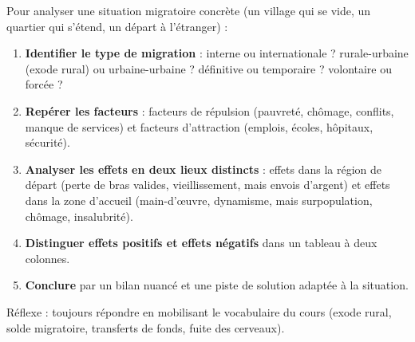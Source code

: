 \documentclass[11pt]{article}
\newcommand{\cle}[1]{{\popxbold\color{popdark}#1}}
\begin{document}
\begin{methode}
Pour analyser une situation migratoire concrète (un village qui se vide, un quartier qui s'étend, un départ à l'étranger) :
\begin{enumerate}
\item \textbf{Identifier le type de migration} : interne ou internationale ? rurale-urbaine (exode rural) ou urbaine-urbaine ? définitive ou temporaire ? volontaire ou forcée ?
\item \textbf{Repérer les facteurs} : facteurs de répulsion (pauvreté, chômage, conflits, manque de services) et facteurs d'attraction (emplois, écoles, hôpitaux, sécurité).
\item \textbf{Analyser les effets en deux lieux distincts} : effets dans la \cle{région de départ} (perte de bras valides, vieillissement, mais envois d'argent) et effets dans la \cle{zone d'accueil} (main-d'œuvre, dynamisme, mais surpopulation, chômage, insalubrité).
\item \textbf{Distinguer effets positifs et effets négatifs} dans un tableau à deux colonnes.
\item \textbf{Conclure} par un bilan nuancé et une piste de solution adaptée à la situation.
\end{enumerate}
Réflexe : toujours répondre en mobilisant le vocabulaire du cours (\cle{exode rural}, \cle{solde migratoire}, \cle{transferts de fonds}, \cle{fuite des cerveaux}).
\end{methode}
\end{document}
